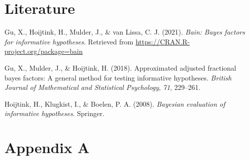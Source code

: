 \documentclass[
]{book}
\begin{document}
\hypertarget{literature}{%
\chapter*{Literature}\label{literature}}

\hypertarget{refs}{}
\leavevmode\hypertarget{ref-bain}{}%
Gu, X., Hoijtink, H., Mulder, J., \& van Lissa, C. J. (2021). \emph{Bain: Bayes factors for informative hypotheses}. Retrieved from \url{https://CRAN.R-project.org/package=bain}

\leavevmode\hypertarget{ref-gu2018approximated}{}%
Gu, X., Mulder, J., \& Hoijtink, H. (2018). Approximated adjusted fractional bayes factors: A general method for testing informative hypotheses. \emph{British Journal of Mathematical and Statistical Psychology}, \emph{71}, 229--261.

\leavevmode\hypertarget{ref-hoijtink2008bayesian}{}%
Hoijtink, H., Klugkist, I., \& Boelen, P. A. (2008). \emph{Bayesian evaluation of informative hypotheses}. Springer.

\hypertarget{appendix-appendix}{%
\appendix}


\hypertarget{appendix-a}{%
\chapter*{Appendix A}\label{appendix-a}}
\end{document}
